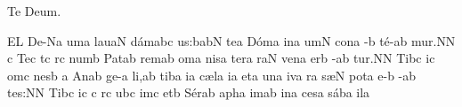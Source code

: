 %
\beginhymn Te Deum.


\Internote
{}
\initiumgregorianum
{}%
\sgn {}E{}\punctum L\egn
\spatium
\sgn De-\pes Na\egn
\sgn {}um\punctum a\egn
\spatium\sgn lau\clivis aN\egn
\sgn d{\'a}m\quilismascandicus abc\egn
\sgn {}u{s:}\clivis ba\augmentumduplex bN\egn
\spatium
\Asteriscus
\divisiominor
\spatium
\sgn te{}\punctum a\egn
\spatium
\sgn D{\'o}m\punctum a\egn
\sgn {}in\punctum a\egn
\sgn {}um\punctum N\egn
\spatium
\sgn con\punctum a\egn
{}-\punctum b\egn
\sgn t{\'e}-\punctum a\augmentum b\egn
\sgn mu{r.}\punctum N\augmentum N\egn
\spatium
\divisiofinalis
\custos c
\lineaproxima
%
\sgn Te{}\punctum c\egn
\spatium
\sgn {}{\ae}t\punctum c\egn
{}r\punctum c\egn
\sgn num\punctum b\egn
\spatium
\sgn Pat\pes ab\egn
\sgn rem\punctum a\augmentum b\egn
\spatium
\divisiominor
\spatium
\sgn {}om\punctum a\egn
\sgn nis\punctum a\egn
\spatium
\sgn ter\punctum a\egn
\sgn ra{}\punctum N\egn
\spatium
\sgn ven\punctum a\egn
\sgn {}er\punctum b\egn
{}-\punctum a\augmentum b\egn
\sgn tu{r.}\punctum N\augmentum N\egn
\spatium\divisiofinalis\spatium
\sgn Tib\punctum c\egn
\sgn {}i{}\punctum c\egn
\spatium
\sgn {}om\punctum c\egn
\sgn nes\punctum b\egn
\spatium
\custos a
\lineaproxima
%
\sgn {}An\pes ab\egn
\sgn ge-\punctum a\egn
\sgn li,\punctum a\augmentum b\egn
\spatium\divisiominor\spatium
\sgn tib\punctum a\egn
\sgn {}i{}\punctum a\egn
\spatium
\sgn c{\ae}l\punctum a\egn
\sgn {}i{}\punctum a\egn
\spatium
\sgn {}et\punctum a\egn
\spatium
\sgn {}un\punctum a\egn
\sgn {}iv\punctum a\egn
{}r\punctum a\egn
\sgn s{\ae}{}\punctum N\egn
\spatium\sgn pot\punctum a\egn
\sgn {}e-\punctum b\egn
{}-\punctum a\augmentum b\egn
\sgn te{s:}\punctum N\augmentum N\egn
\spatium\divisiofinalis\spatium
\sgn Tib\punctum c\egn
\sgn {}i{}\punctum c\egn
\custos c
\lineaproxima
%
\spatium{}r\punctum c\egn
\sgn {}ub\punctum c\egn
\sgn {}im\punctum c\egn
\spatium
\sgn {}et\punctum b\egn
\spatium
\sgn S{\'e}r\pes ab\egn
\sgn {}a{ph}\punctum a\egn
\sgn {}im\punctum a\augmentum b\egn
\spatium\divisiominor\spatium
\sgn {}in\punctum a\egn
\sgn ces\punctum a\egn
\sgn s{\'a}b\engl{}\punctum a\egn
\sgn {}il\punctum a\egn
